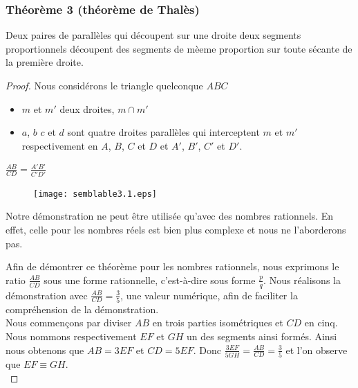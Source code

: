 \documentclass[a4paper,12pt]{article}
\begin{document}
\pagebreak
\subsubsection{Théorème 3 (théorème de Thalès)}
\begin{theorem}
Deux paires de parallèles qui découpent sur une droite deux segments proportionnels découpent des segments de mèeme proportion sur toute sécante de la première droite.
\end{theorem}

\begin{proof}
Nous considérons le triangle quelconque $ABC$ 
\begin{hyp}

\begin{itemize}
    \item $m$ et $m'$ deux droites, $m \cap m'$
    \item $a$, $b$ $c$ et $d$ sont quatre droites parallèles qui interceptent $m$ et $m'$ respectivement en $A$, $B$, $C$ et $D$ et $A'$, $B'$, $C'$ et $D'$.
\end{itemize}

\end{hyp}

\begin{concl}
$\frac{AB}{CD} = \frac{A'B'}{C'D'}$
\end{concl}
\begin{figure}[H]
        \centering
        \texttt{[image: semblable3.1.eps]}
    \end{figure}

\begin{remark}
Notre démonstration ne peut être utilisée qu'avec des nombres rationnels. En effet, celle pour les nombres réels est bien plus complexe et nous ne l'aborderons pas.
\end{remark}

Afin de démontrer ce théorème pour les nombres rationnels, nous exprimons le ratio $\frac{AB}{CD}$ sous une forme rationnelle, c'est-à-dire sous forme $\frac{p}{q}$. Nous réalisons la démonstration avec $\frac{AB}{CD} = \frac{3}{5}$, une valeur numérique, afin de faciliter la compréhension de la démonstration.\\

Nous commençons par diviser $AB$ en trois parties isométriques et $CD$ en cinq. Nous nommons respectivement $EF$ et $GH$ un des segments ainsi formés.
Ainsi nous obtenons que $AB = 3EF$ et $CD = 5EF$. Donc $\frac{3EF}{5GH} = \frac{AB}{CD} = \frac{3}{5}$ et l'on observe que $EF \equiv GH$.\\


\end{proof}
\end{document}
